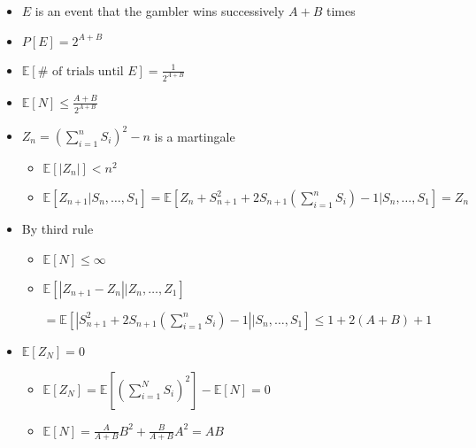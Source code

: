\documentclass[a4paper]{article}
\begin{document}
\section{}
\begin{itemize}
        \begin{figure} [H]
            \texttt{[image: image/11.png]}
        \end{figure}
    \item $E$ is an event that the gambler wins successively $A+B$ times
    \item $P[E] = 2^{A+B}$
    \item $\mathbb{E}[\# \text{ of trials until } E] = \frac{1}{2^{A+B}}$
    \item $\mathbb{E}[N] \leq \frac{A+B}{2^{A+B}}$
    \item $Z_n = (\sum_{i=1}^n S_i)^2 - n$ is a martingale
        \begin{itemize}
            \item $\mathbb{E}[|Z_n|] < n^2$
            \item $\mathbb{E}[Z_{n+1}|S_n, \dots, S_1] = \mathbb{E}[Z_n + S_{n+1}^2 + 2S_{n+1}(\sum_{i=1}^n S_i) - 1|S_n, \dots, S_1] = Z_n$
        \end{itemize}
    \item By third rule
        \begin{itemize}
            \item $\mathbb{E}[N] \leq \infty$
            \item $\mathbb{E}[|Z_{n+1} - Z_n||Z_n, \dots, Z_1]$

                $= \mathbb{E}[|S_{n+1}^2 + 2S_{n+1}(\sum_{i=1}^n S_i) - 1||S_n, \dots, S_1] \leq 1 + 2(A+B) + 1$
        \end{itemize}
    \item $\mathbb{E}[Z_N] = 0$
        \begin{itemize}
            \item $\mathbb{E}[Z_N] = \mathbb{E}[(\sum_{i=1}^N S_i)^2] - \mathbb{E}[N] = 0$
            \item $\mathbb{E}[N] = \frac{A}{A+B}B^2 + \frac{B}{A+B}A^2 = AB$
        \end{itemize}
\end{itemize}
\end{document}
